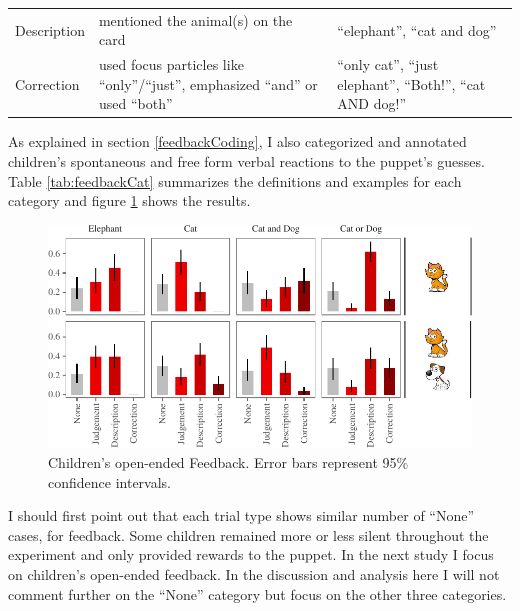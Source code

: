 \documentclass[oneside]{report}
\theoremstyle{definition}
\theoremstyle{definition}
\theoremstyle{definition}
\theoremstyle{remark}
\begin{document}
\begin{longtable}[]{@{}lll@{}}
\begin{minipage}[t]{0.16\columnwidth}\raggedright\strut
Description\strut
\end{minipage} & \begin{minipage}[t]{0.44\columnwidth}\raggedright\strut
mentioned the animal(s) on the card\strut
\end{minipage} & \begin{minipage}[t]{0.24\columnwidth}\raggedright\strut
``elephant'', ``cat and dog''\strut
\end{minipage}\tabularnewline
\begin{minipage}[t]{0.16\columnwidth}\raggedright\strut
Correction\strut
\end{minipage} & \begin{minipage}[t]{0.44\columnwidth}\raggedright\strut
used focus particles like ``only''/``just'', emphasized ``and'' or used
``both''\strut
\end{minipage} & \begin{minipage}[t]{0.24\columnwidth}\raggedright\strut
``only cat'', ``just elephant'', ``Both!'', ``cat AND dog!''\strut
\end{minipage}\tabularnewline
\bottomrule
\end{longtable}
As explained in section \ref{feedbackCoding}, I also categorized and
annotated children's spontaneous and free form verbal reactions to the
puppet's guesses. Table \ref{tab:feedbackCat} summarizes the definitions
and examples for each category and figure \ref{fig:feedbackData} shows
the results.
\begin{figure}[h]

{\centering \includegraphics{figs/feedbackData-1} 

}

\caption{Children's open-ended Feedback. Error bars represent 95\% confidence intervals.}\label{fig:feedbackData}
\end{figure}
I should first point out that each trial type shows similar number of
``None'' cases, for feedback. Some children remained more or less silent
throughout the experiment and only provided rewards to the puppet. In
the next study I focus on children's open-ended feedback. In the
discussion and analysis here I will not comment further on the ``None''
category but focus on the other three categories.
\end{document}
